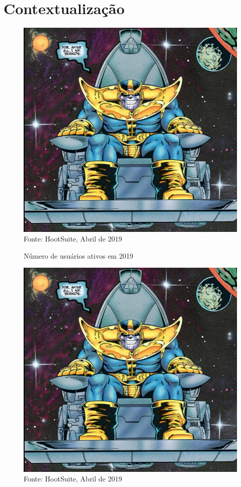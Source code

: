\section{Contextualização}
\begin{frame}{}
	\begin{figure}
		\caption{Número de usuários ativos em 2019}
		\includegraphics[width = 0.65\linewidth]{img/lorem-picsum.jpg}\\
		\tiny Fonte: HootSuite, Abril de 2019
	\end{figure}
\end{frame}

\begin{frame}{}
	\begin{figure}
		\caption{}
		\includegraphics[width = 0.65\linewidth]{img/lorem-picsum.jpg}\\
		\tiny Fonte: HootSuite, Abril de 2019
	\end{figure}
\end{frame}

